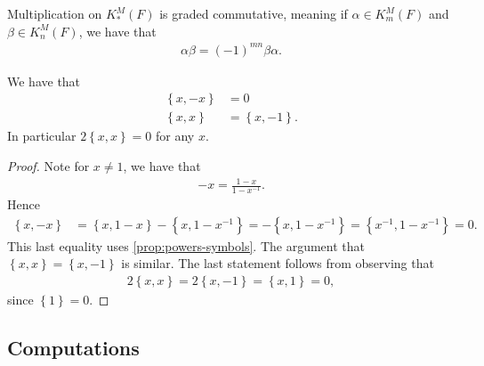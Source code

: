 \documentclass[11pt,openany]{book}
\begin{document}
\begin{proposition} \cite[1.1]{MilnorK}
Multiplication on $K_\ast^M(F)$ is graded commutative, meaning if $\alpha \in K_m^M(F)$ and $\beta \in K_n^M(F)$, we have that
\begin{align*}
    \alpha\beta = (-1)^{mn}\beta\alpha.
\end{align*}
\end{proposition}

\begin{proposition}\label{prop:KM2-relations} 
\cite[1.1,~1.2]{MilnorK}
We have that
\begin{align*}
    \left\{ x,-x \right\} &= 0 \\
    \left\{ x,x \right\} &= \left\{ x,-1 \right\}.
\end{align*}
In particular $2\left\{ x,x \right\} = 0$ for any $x$.
\end{proposition}
\begin{proof} Note for $x\ne 1$, we have that
\begin{align*}
    -x = \frac{1-x}{ 1- x^{-1}}.
\end{align*}
%
Hence 
\begin{align*}
    \left\{ x,-x \right\} &= \left\{ x,1-x \right\} - \left\{ x, 1-x^{-1} \right\} = -\left\{ x, 1- x^{-1} \right\} = \left\{x^{-1}, 1-x^{-1} \right\} = 0.
\end{align*}
This last equality uses \autoref{prop:powers-symbols}.
The argument that $\left\{ x,x \right\} = \left\{ x,-1 \right\}$ is similar.
The last statement follows from observing that
\begin{align*}
    2\left\{ x,x \right\} = 2 \left\{ x, -1 \right\} = \left\{ x, 1 \right\} = 0,
\end{align*}
since $\left\{ 1 \right\} = 0$.
\end{proof}



\subsection{Computations}
\end{document}
